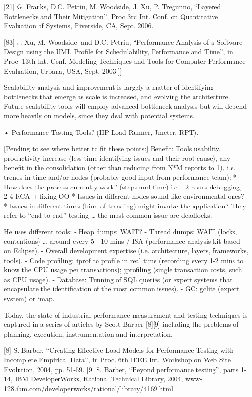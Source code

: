 \documentclass[runningheads,a4paper]{llncs}
\begin{document}
[21] G. Franks, D.C. Petriu, M. Woodside, J. Xu, P. Tregunno, 
“Layered Bottlenecks and Their Mitigation”, Proc 3rd Int. Conf. on Quantitative
Evaluation of Systems, Riverside, CA, Sept. 2006.

[83] J. Xu, M. Woodside, and D.C. Petriu, 
“Performance Analysis of a Software Design using the UML Profile for
Schedulability, Performance and Time”, in Proc. 13th Int.
Conf. Modeling Techniques and Tools for Computer Performance Evaluation, Urbana,
USA, Sept. 2003 ]]

Scalability analysis and improvement is largely a matter of identifying
bottlenecks that emerge as scale is increased, and evolving the architecture. Future
scalability tools will employ advanced bottleneck analysis but will depend more
heavily on models, since they deal with potential systems.


•	Performance Testing Tools? (HP Load Runner, Jmeter, RPT).

[Pending to see where better to fit these points:]
Benefit: Tools usability, productivity increase (less time identifying issues and their root cause), any benefit in the consolidation (other than reducing from N*M reports to 1), i.e. trends in time and/or nodes (probably good input from performance team):
* How does the process currently work? (steps and time) i.e. ~2 hours debugging, 2-4 RCA + fixing OO
* Issues in different nodes sound like environmental ones?
* Issues in different times (kind of trending) might involve the application?
They refer to “end to end” testing … the most common issue are deadlocks.

He uses different tools:
- Heap dumps: WAIT?
- Thread dumps: WAIT (locks, contentions) … around every 5 - 10 mins / ISA (performance analysis kit based on Eclipse).
- Overall development expertise (i.e. architecture, layers, frameworks, tools).
- Code profiling: tprof to profile in real time (recording every 1-2 mins to know the CPU usage per transactions); jprofiling (single transaction costs, such as CPU usage).
- Database: Tunning of SQL queries (or expert systems that encapsulate the identification of the most common issues).
- GC: gclite (expert system) or jmap.

Today, the state of industrial performance measurement and testing techniques is
captured in a series of articles by Scott Barber [8][9] including the problems
of planning, execution, instrumentation and interpretation.

[8] S. Barber, “Creating Effective Load Models for Performance Testing with
Incomplete Empirical Data”, in Proc. 6th IEEE Int. Workshop on Web Site Evolution, 2004,
pp. 51-59.
[9] S. Barber, “Beyond performance testing”, parts 1-14, IBM DeveloperWorks,
Rational Technical Library, 2004, www-128.ibm.com/developerworks/rational/library/4169.html
\end{document}
